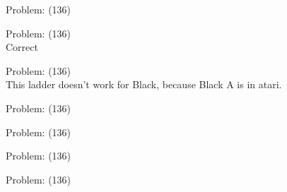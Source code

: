 \documentclass[11pt]{article}
\begin{document}
\begin{minipage}[t]{0.5\textwidth}
  {\centering
  
  Problem: (136)\\
  
  }
\end{minipage}
\begin{minipage}[t]{0.5\textwidth}
  {\centering
  
  Problem: (136)\\
  Correct\\
  }
\end{minipage}
\begin{minipage}[t]{0.5\textwidth}
  {\centering
  
  Problem: (136)\\
  This ladder doesn't work for Black, because Black A is in atari.\\
  }
\end{minipage}
\begin{minipage}[t]{0.5\textwidth}
  {\centering
  
  Problem: (136)\\
  
  }
\end{minipage}
\begin{minipage}[t]{0.5\textwidth}
  {\centering
  
  Problem: (136)\\
  
  }
\end{minipage}
\begin{minipage}[t]{0.5\textwidth}
  {\centering
  
  Problem: (136)\\
  
  }
\end{minipage}
\begin{minipage}[t]{0.5\textwidth}
  {\centering
  
  Problem: (136)\\
  
  }
\end{minipage}
\end{document}
